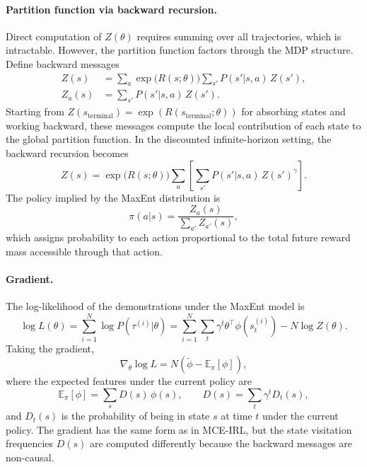 \documentclass[10pt]{article}
\newcommand{\E}{\mathbb{E}}
\begin{document}
\paragraph{Partition function via backward recursion.}
Direct computation of $Z(\theta)$ requires summing over all trajectories, which is intractable. However, the partition function factors through the MDP structure. Define backward messages
\begin{align}
Z(s) &= \sum_a \exp\!\bigl(R(s;\theta)\bigr) \sum_{s'} P(s'|s,a)\, Z(s'), \label{eq:backward_z} \\
Z_a(s) &= \sum_{s'} P(s'|s,a)\, Z(s'). \label{eq:backward_za}
\end{align}
Starting from $Z(s_{\text{terminal}}) = \exp(R(s_{\text{terminal}};\theta))$ for absorbing states and working backward, these messages compute the local contribution of each state to the global partition function. In the discounted infinite-horizon setting, the backward recursion becomes
\begin{equation}
\label{eq:backward_discount}
Z(s) = \exp\!\bigl(R(s;\theta)\bigr) \sum_a \left[\sum_{s'} P(s'|s,a)\, Z(s')^{\gamma}\right].
\end{equation}
The policy implied by the MaxEnt distribution is
\begin{equation}
\label{eq:maxent_policy}
\pi(a|s) = \frac{Z_a(s)}{\sum_{a'} Z_{a'}(s)},
\end{equation}
which assigns probability to each action proportional to the total future reward mass accessible through that action.

\paragraph{Gradient.}
The log-likelihood of the demonstrations under the MaxEnt model is
\begin{equation}
\log L(\theta) = \sum_{i=1}^N \log P(\tau^{(i)}|\theta) = \sum_{i=1}^N \sum_t \gamma^t \theta^\top \phi(s_t^{(i)}) - N \log Z(\theta).
\end{equation}
Taking the gradient,
\begin{equation}
\label{eq:maxent_gradient}
\nabla_\theta \log L = N\!\left(\tilde\phi - \E_\pi[\phi]\right),
\end{equation}
where the expected features under the current policy are
\begin{equation}
\E_\pi[\phi] = \sum_s D(s)\, \phi(s), \qquad D(s) = \sum_t \gamma^t D_t(s),
\end{equation}
and $D_t(s)$ is the probability of being in state $s$ at time $t$ under the current policy. The gradient has the same form as in MCE-IRL, but the state visitation frequencies $D(s)$ are computed differently because the backward messages are non-causal.
\end{document}
